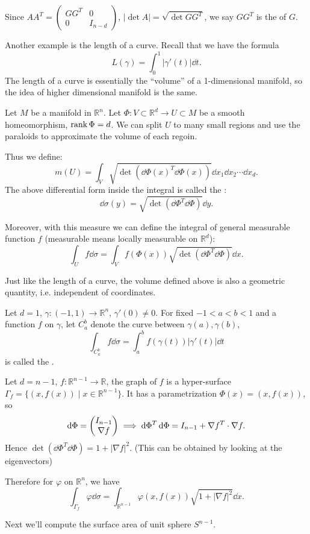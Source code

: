 Since $A A^T = \begin{pmatrix}
	GG^T &0 \\0 &I_{n-d}
\end{pmatrix}$, $|\det A| = \sqrt{\det GG^T}$,
we say $GG^T$ is the  of $G$.

Another example is the length of a curve. Recall that we have the formula
\[
L(\gamma) = \int_0^1 |\gamma'(t)|\dd t.
\]
The length of a curve is essentially the ``volume'' of a 1-dimensional manifold,
so the idea of higher dimensional manifold is the same.

\begin{definition}
	Let $M$ be a manifold in $\mathbb{R}^{n}$.
	Let $\Phi: V \subset \mathbb{R}^{d}\to U \subset M$ be a smooth homeomorphism,
	$\operatorname{rank} \Phi = d$. We can split $U$ to many small regions and use
	the paraloids to approximate the volume of each regoin.

	Thus we define:
	\[
	m(U) =
	\int_{V} \sqrt{\det (\dd \Phi(x)^T \dd \Phi(x))}\dd x_1\dd x_2\cdots \dd x_d.
	\]
	The above differential form inside the integral is called the :
	\[
	\dd \sigma(y) = \sqrt{\det(\dd \Phi^T \dd \Phi)} \dd y.
	\]

	Moreover, with this measure we can define the integral of general measurable
	function $f$ (measurable means locally measurable on $\mathbb{R}^{d}$):
	\[
	\int_U f\dd\sigma = \int_V f(\Phi(x)) \sqrt{\det(\dd \Phi^T \dd \Phi)}\dd x.
	\]
\end{definition}

Just like the length of a curve, the volume defined above is also
a geometric quantity, i.e. independent of coordinates.

\begin{example}
    Let $d = 1$, $\gamma: (-1, 1)\to \mathbb{R}^{n}$, $\gamma'(0)\ne 0$.
	For fixed $-1<a<b<1$ and a function $f$ on $\gamma$, let $C_a^b$ denote
	the curve between $\gamma(a), \gamma(b)$,
	\[
	\int_{C_a^b}f\dd \sigma = \int_a^b f(\gamma(t))|\gamma'(t)|\dd t
	\]
	is called the .
\end{example}
\begin{example}
    Let $d = n - 1$, $f: \mathbb{R}^{n-1}\to \mathbb{R}$, the graph of $f$ is
	a hyper-surface $\Gamma_f = \{(x, f(x))\mid x\in \mathbb{R}^{n-1}\}$.
	It has a parametrization $\Phi(x) = (x, f(x))$, so
	\[
	\mathop{}\!\mathrm{d} \Phi = \begin{pmatrix} I_{n-1}\\\nabla f \end{pmatrix}\implies \mathop{}\!\mathrm{d} \Phi^T \mathop{}\!\mathrm{d} \Phi = I_{n-1}
	+ \nabla f^T \cdot \nabla f.
	\]
	Hence $\det(\dd \Phi^T \dd \Phi) = 1 + |\nabla f|^2$.
	(This can be obtained by looking at the eigenvectors)

	Therefore for $\varphi$ on $\mathbb{R}^{n}$, we have
	\[
	\int_{\Gamma_f} \varphi\dd\sigma = \int_{\mathbb{R}^{n-1}} \varphi(x, f(x))
	\sqrt{1 + |\nabla f|^2}\dd x.
	\]
\end{example}
Next we'll compute the surface area of unit sphere $S^{n-1}$.

